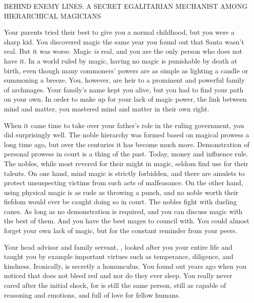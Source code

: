 \documentclass[char]{guildcamp3}
\begin{document}
\name{\cNobleOne{}}




BEHIND ENEMY LINES: A SECRET EGALITARIAN MECHANIST AMONG HIERARCHICAL MAGICIANS

Your parents tried their best to give you a normal childhood, but you were a sharp kid. You discovered magic the same year you found out that Santa wasn't real. But it was worse. Magic \emph{is} real, and you are the only person who does not have it. In a world ruled by magic, having no magic is punishable by death at birth, even though many commoners' powers are as simple as lighting a candle or summoning a breeze. You, however, are heir to a prominent and powerful family of archmages. Your family's name kept you alive, but you had to find your path on your own. In order to make up for your lack of magic power, the link between mind and matter, you mastered mind and matter in their own right.

When it came time to take over your father's role in the ruling government, you did surprisingly well. The noble hierarchy was formed based on magical prowess a long time ago, but over the centuries it has become much more. Demonstration of personal prowess in court is a thing of the past. Today, money and influence rule. The nobles, while most revered for their might in magic, seldom find use for their talents. On one hand, mind magic is strictly forbidden, and there are amulets to protect unsuspecting victims from such acts of malfeasance. On the other hand, using physical magic is as rude as throwing a punch, and no noble worth their fiefdom would ever be caught doing so in court. The nobles fight with dueling canes. As long as no demonstration is required, and you can discuss magic with the best of them. And you have the best mages to council with. You could almost forget your own lack of magic, but for the constant reminder from your peers.

Your head advisor and family servant, \cServant{\intro}, looked after you your entire life and taught you by example important virtues such as temperance, diligence, and kindness. Ironically,  is secretly a homunculus. You found out years ago when you noticed that  does not bleed red and nor do they ever sleep. You really never cared after the initial shock, for  is still the same person, still as capable of reasoning and emotions, and full of love for  fellow humans.
\end{document}
